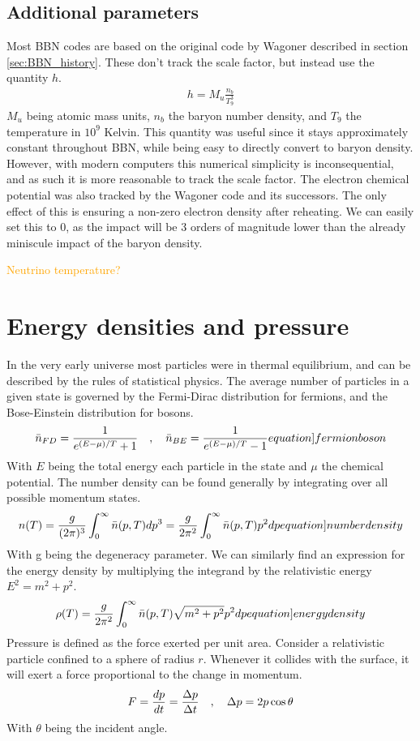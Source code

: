 \subsection{Additional parameters}
Most BBN codes are based on the original code by Wagoner described in section \ref{sec:BBN_history}. These don't track the scale factor, but instead use the quantity $h$.
\begin{align}
    h=M_u\frac{n_{b}}{T^3_9}
\end{align}
$M_u$ being atomic mass units, $n_b$ the baryon number density, and  $T_9$ the temperature in $10^9$ Kelvin. This quantity was useful since it stays approximately constant throughout BBN, while being easy to directly convert to baryon density. However, with modern computers this numerical simplicity is inconsequential, and as such it is more reasonable to track the scale factor.
The electron chemical potential was also tracked by the Wagoner code and its successors. The only effect of this is ensuring a non-zero electron density after reheating. We can easily set this to 0, as the impact will be 3 orders of magnitude lower than the already miniscule impact of the baryon density.

\textcolor{orange}{Neutrino temperature?}


\section{Energy densities and pressure}

In the very early universe most particles were in thermal equilibrium, and can be described by the rules of statistical physics. The average number of particles in a given state is governed by the Fermi-Dirac distribution for fermions, and the Bose-Einstein distribution for bosons.
\begin{align}
    \bar{n}_{FD}=\frac{1}{e^{(E-\mu)/T}+1} \eqsep   \bar{n}_{BE}=\frac{1}{e^{(E-\mu)/T}-1}
    \label[equation]{fermionboson}
\end{align}
With $E$ being the total energy each particle in the state and $\mu$ the chemical potential. The number density can be found generally by integrating over all possible momentum states. 
\begin{align}
    n(T)=\frac{g}{(2\pi)^3}\int_{0}^{\infty}\bar{n}(p,T)dp^3=\frac{g}{2\pi^2}\int_{0}^{\infty}\bar{n}(p,T) p^2 dp
    \label[equation]{numberdensity}
\end{align}
With g being the degeneracy parameter. We can similarly find an expression for the energy density by multiplying the integrand by the relativistic energy $E^2=m^2+p^2$.
\begin{align}
    \rho(T)=\frac{g}{2\pi^2}\int_{0}^{\infty}\bar{n}(p,T)\sqrt{m^2+p^2} p^2 dp
    \label[equation]{energydensity}
\end{align}
Pressure is defined as the force exerted per unit area. Consider a relativistic particle confined to a sphere of radius $r$. Whenever it collides with the surface, it will exert a force proportional to the change in momentum. 
\begin{align}
    F=\frac{dp}{dt}=\frac{\Delta p }{\Delta t}\quad , \quad
    \Delta p = 2p \cos \theta
\end{align}
With $\theta$ being the incident angle. 

